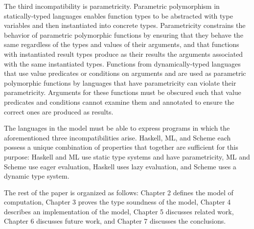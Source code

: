 The third incompatibility is parametricity.  Parametric polymorphism in statically-typed languages enables function types to be abstracted with type variables and then instantiated into concrete types.  Parametricity constrains the behavior of parametric polymorphic functions by ensuring that they behave the same regardless of the types and values of their arguments, and that functions with instantiated result types produce as their results the arguments associated with the same instantiated types.  Functions from dynamically-typed languages that use value predicates or conditions on arguments and are used as parametric polymorphic functions by languages that have parametricity can violate their parametricity.  Arguments for these functions must be obscured such that value predicates and conditions cannot examine them and annotated to ensure the correct ones are produced as results.

The languages in the model must be able to express programs in which the aforementioned three incompatibilities arise.  Haskell, ML, and Scheme each possess a unique combination of properties that together are sufficient for this purpose: Haskell and ML use static type systems and have parametricity, ML and Scheme use eager evaluation, Haskell uses lazy evaluation, and Scheme uses a dynamic type system.

The rest of the paper is organized as follows: Chapter 2 defines the model of computation, Chapter 3 proves the type soundness of the model, Chapter 4 describes an implementation of the model, Chapter 5 discusses related work, Chapter 6 discusses future work, and Chapter 7 discusses the conclusions.
